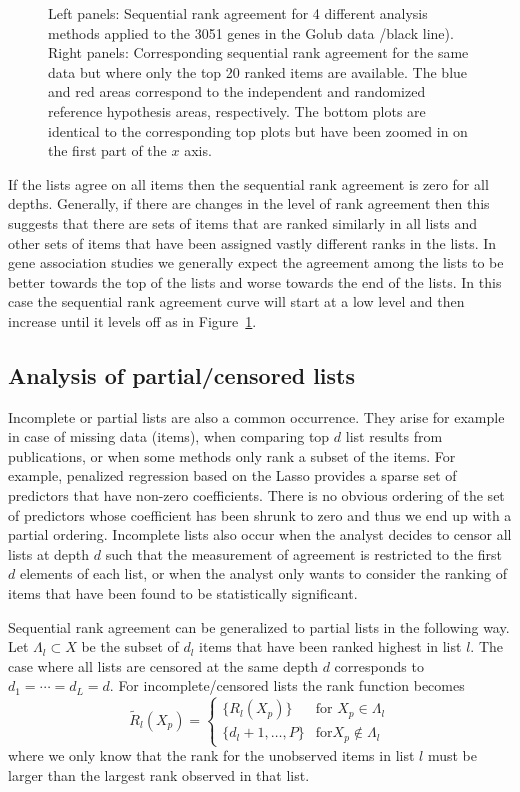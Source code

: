 \documentclass[12pt,a4paper]{article}
\theoremstyle{plain}
\begin{document}
\begin{figure}[htbp]
\begin{center}
 \end{center}
 \caption{Left panels: Sequential rank agreement for 4 different
   analysis methods applied to the 3051 genes in the Golub data /black
   line). Right
   panels: Corresponding sequential rank agreement for the same data
   but where only the top 20 ranked items are available. The blue and
   red areas correspond to the independent and randomized reference
   hypothesis areas, respectively. The bottom plots are identical to
   the corresponding top plots but have been zoomed in on the first
   part of the $x$ axis.}
 \label{fig:example1}
 \end{figure}

 If the lists agree on all items then the sequential rank agreement is
 zero for all depths. Generally, if there are changes in the level of
 rank agreement then this suggests that there are sets of items that
 are ranked similarly in all lists and other sets of items that have
 been assigned vastly different ranks in the lists. In gene
 association studies we generally expect the agreement among the lists
 to be better towards the top of the lists and worse towards the end
 of the lists. In this case the sequential rank agreement curve will
 start at a low level and then increase until it levels off as in
 Figure~\ref{fig:example1}.

\subsection{Analysis of partial/censored lists}
Incomplete or partial lists are also a common occurrence. They arise
for example in case of missing data (items), when comparing top $d$
list results from publications, or when some methods only rank a
subset of the items. For example, penalized regression based on the
Lasso provides a sparse set of predictors that have non-zero
coefficients. There is no obvious ordering of the set of predictors
whose coefficient has been shrunk to zero and thus we end up with a
partial ordering. Incomplete lists also occur when the analyst decides
to censor all lists at depth $d$ such that the measurement of
agreement is restricted to the first $d$ elements of each list, or
when the analyst only wants to consider the ranking of items that have
been found to be statistically significant.

Sequential rank agreement can be generalized to partial lists in the
following way. Let $\Lambda_l\subset X$ be the subset of $d_l$ items
that have been ranked highest in list $l$.  The case where all lists are
censored at the same depth $d$ corresponds to $d_1=\cdots=d_L=d$. For
incomplete/censored lists the rank function becomes
\begin{equation}
	\widetilde R_l(X_p) = \begin{cases}
	     \{R_l(X_p)\} & \text{for } X_p\in \Lambda_l\\
	     \{d_l+1,\dots,P\} & \text{for} X_p \not\in \Lambda_l
        \end{cases}
\end{equation}
where we only know that the rank for the unobserved items in list $l$
must be larger than the largest rank observed in that list.
\end{document}
